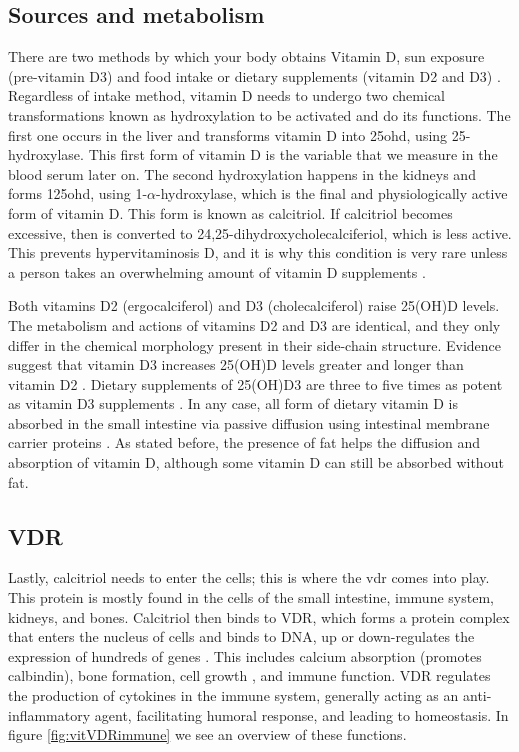 \subsection{Sources and metabolism}

There are two methods by which your body obtains Vitamin D, sun exposure (pre-vitamin D3) and food intake or dietary supplements (vitamin D2 and D3) \cite{Bikle2000-yu}. Regardless of intake method, vitamin D needs to undergo two chemical transformations known as hydroxylation to be activated and do its functions. The first one occurs in the liver and transforms vitamin D into \gls{25ohd}, using 25-hydroxylase. This first form of vitamin D is the variable that we measure in the blood serum later on. The second hydroxylation happens in the kidneys and forms \gls{125ohd}, using 1-$\alpha$-hydroxylase, which is the final and physiologically active form of vitamin D. This form is known as calcitriol. If calcitriol becomes excessive, then is converted to 24,25-dihydroxycholecalciferiol, which is less active. This prevents hypervitaminosis D, and it is why this condition is very rare \cite{Holick1995} unless a person takes an overwhelming amount of vitamin D supplements \cite{MarcinowskaSuchowierska2018}.

Both vitamins D2 (ergocalciferol) and D3 (cholecalciferol) raise 25(OH)D levels. The metabolism and actions of vitamins D2 and D3 are identical, and they only differ in the chemical morphology present in their side-chain structure. Evidence suggest that vitamin D3 increases 25(OH)D levels greater and longer than vitamin D2 \cite{ref:Tripkovic2012, ref:Lehmann2013, ref:Logan2012, ref:Tripkovic2017}. Dietary supplements of 25(OH)D3 are three to five times as potent as vitamin D3 supplements \cite{ref:GraeffArmas2019, ref:QuesadaGomez2018}. In any case, all form of dietary vitamin D is absorbed in the small intestine via passive diffusion using intestinal membrane carrier proteins \cite{ref:Silva2017}. As stated before, the presence of fat helps the diffusion and absorption of vitamin D, although some vitamin D can still be absorbed without fat.

\subsection{VDR}

Lastly, calcitriol needs to enter the cells; this is where the \gls{vdr} comes into play. This protein is mostly found in the cells of the small intestine, immune system, kidneys, and bones. Calcitriol then binds to VDR, which forms a protein complex that enters the nucleus of cells and binds to DNA, up or down-regulates the expression of hundreds of genes \cite{Nagpal2005, Dusso2005}. This includes calcium absorption (promotes calbindin), bone formation, cell growth \cite{Samuel2008}, and immune function. VDR regulates the production of cytokines in the immune system, generally acting as an anti-inflammatory agent, facilitating humoral response, and leading to homeostasis. In figure \ref{fig:vitVDRimmune} we see an overview of these functions.

